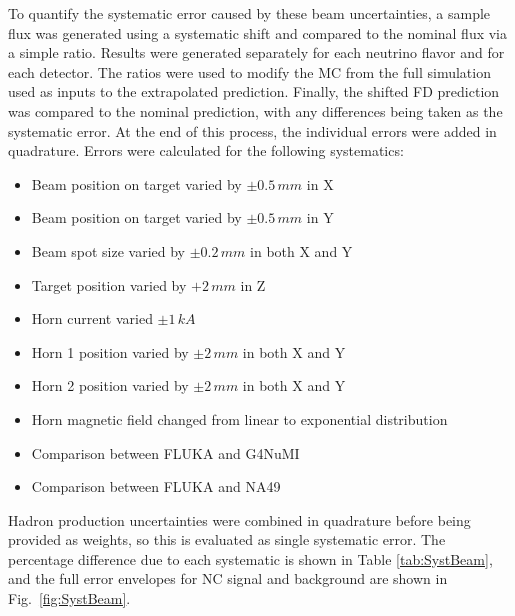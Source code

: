 To quantify the systematic error caused by these beam uncertainties, a sample flux was generated using a systematic shift and compared to the nominal flux via a simple ratio. Results were generated separately for each neutrino flavor and for each detector. The ratios were used to modify the MC from the full simulation used as inputs to the extrapolated prediction. Finally, the shifted FD prediction was compared to the nominal prediction, with any differences being taken as the systematic error. At the end of this process, the individual errors were added in quadrature. Errors were calculated for the following systematics:
\begin{itemize}
  \item Beam position on target varied by $\pm 0.5\,mm$ in X
  \item Beam position on target varied by $\pm 0.5\,mm$ in Y
  \item Beam spot size varied by $\pm 0.2\,mm$ in both X and Y
  \item Target position varied by $+ 2\, mm$ in Z
  \item Horn current varied $\pm 1\,kA$
  \item Horn 1 position varied by $\pm 2\,mm$ in both X and Y
  \item Horn 2 position varied by $\pm 2\,mm$ in both X and Y
  \item Horn magnetic field changed from linear to exponential distribution
  \item Comparison between FLUKA and G4NuMI
  \item Comparison between FLUKA and NA49
\end{itemize}
\n Hadron production uncertainties were combined in quadrature before being provided as weights, so this is evaluated as single systematic error. The percentage difference due to each systematic is shown in Table \ref{tab:SystBeam}, and the full error envelopes for NC signal and background are shown in Fig.~\ref{fig:SystBeam}.
